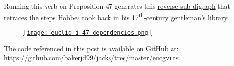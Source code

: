 Running this verb on Proposition 47 generates this
\href{https://bakerjd99.files.wordpress.com/2023/06/euclid_i_47_dependencies.pdf}{reverse
sub-digraph} that retraces the steps Hobbes took back in his
17\textsuperscript{th}-century gentleman's library.

\captionsetup[figure]{labelformat=empty}
\begin{figure}[htbp]
\centering
\href{https://bakerjd99.files.wordpress.com/2023/06/euclid_i_47_dependencies.png}{\texttt{[image: euclid\_i\_47\_dependencies.png]}}
\caption[Proposition 47 dependencies]{}
\label{fig:7864x0}
\end{figure}

The code referenced in this post is available on GitHub at:
\url{https://github.com/bakerjd99/jacks/tree/master/eucgvuts}

%
